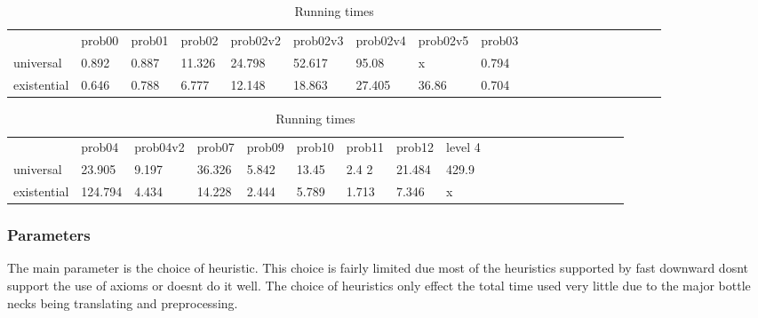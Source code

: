 	\begin{table}[h]
		\centering
		\caption{Running times}
		\label{times}
		\begin{tabular}{llllllllllllllllllll}
			& prob00 & prob01& prob02& prob02v2& prob02v3& prob02v4& prob02v5& prob03\\
			universal 	& 0.892  &0.887  &11.326 &24.798   &52.617   &95.08    & x       &0.794    \\
			existential &0.646   &0.788  &6.777  &12.148   &18.863   &27.405   &36.86    &0.704  \\
		\end{tabular}
		\begin{tabular}{llllllllllllllllllll}
			&  prob04& prob04v2& prob07&  prob09& prob10& prob11& prob12 & level 4\\
			universal    &23.905  &9.197      &36.326   &5.842  &13.45  &2.4 2           &21.484 &429.9\\
			existential      &124.794 &4.434   &14.228 &2.444  &5.789  &1.713        &7.346 & x\\
		\end{tabular}
	\end{table}
	
	
	

	\subsubsection{Parameters}
	The main parameter is the choice of heuristic. This choice is fairly limited due most of the heuristics supported by fast downward dosnt support the use of axioms or doesnt do it well. The choice of heuristics only effect the total time used very little due to the major bottle necks being translating and preprocessing.
	
	




